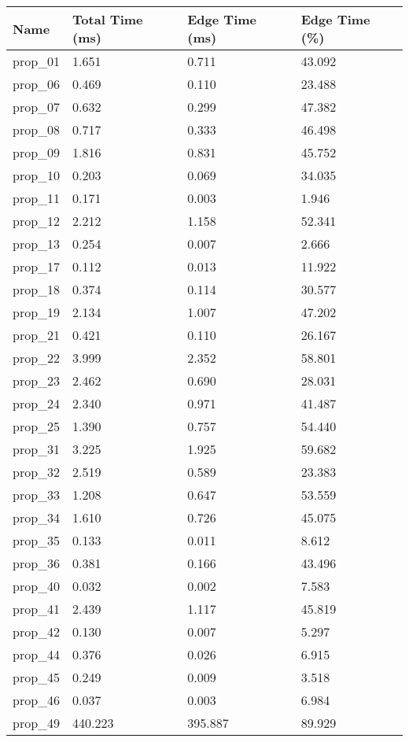 \begin{tabular}{|llll|}
\hline
Name & Total Time (ms) & Edge Time (ms) & Edge Time (\%)\\\hline
prop_01 & 1.651 & 0.711 & 43.092\\\midrule
prop_06 & 0.469 & 0.110 & 23.488\\\midrule
prop_07 & 0.632 & 0.299 & 47.382\\\midrule
prop_08 & 0.717 & 0.333 & 46.498\\\midrule
prop_09 & 1.816 & 0.831 & 45.752\\\midrule
prop_10 & 0.203 & 0.069 & 34.035\\\midrule
prop_11 & 0.171 & 0.003 & 1.946\\\midrule
prop_12 & 2.212 & 1.158 & 52.341\\\midrule
prop_13 & 0.254 & 0.007 & 2.666\\\midrule
prop_17 & 0.112 & 0.013 & 11.922\\\midrule
prop_18 & 0.374 & 0.114 & 30.577\\\midrule
prop_19 & 2.134 & 1.007 & 47.202\\\midrule
prop_21 & 0.421 & 0.110 & 26.167\\\midrule
prop_22 & 3.999 & 2.352 & 58.801\\\midrule
prop_23 & 2.462 & 0.690 & 28.031\\\midrule
prop_24 & 2.340 & 0.971 & 41.487\\\midrule
prop_25 & 1.390 & 0.757 & 54.440\\\midrule
prop_31 & 3.225 & 1.925 & 59.682\\\midrule
prop_32 & 2.519 & 0.589 & 23.383\\\midrule
prop_33 & 1.208 & 0.647 & 53.559\\\midrule
prop_34 & 1.610 & 0.726 & 45.075\\\midrule
prop_35 & 0.133 & 0.011 & 8.612\\\midrule
prop_36 & 0.381 & 0.166 & 43.496\\\midrule
prop_40 & 0.032 & 0.002 & 7.583\\\midrule
prop_41 & 2.439 & 1.117 & 45.819\\\midrule
prop_42 & 0.130 & 0.007 & 5.297\\\midrule
prop_44 & 0.376 & 0.026 & 6.915\\\midrule
prop_45 & 0.249 & 0.009 & 3.518\\\midrule
prop_46 & 0.037 & 0.003 & 6.984\\\midrule
prop_49 & 440.223 & 395.887 & 89.929\\\midrule

\end{tabular}
